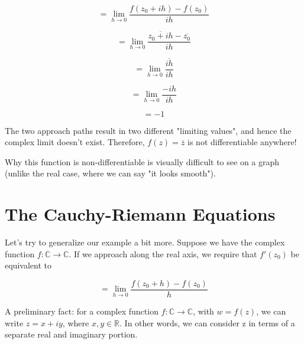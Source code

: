 \documentclass{article}
\newcommand*\conj[1]{\overline{#1}}
\begin{document}
\begin{itemize}
\begin{equation}
= \lim_{h \to 0}\frac{f(z_0 + ih)-f(z_0)}{ih}
\end{equation}

\begin{equation}
= \lim_{h \to 0}\frac{\conj{z_0 + ih}-\conj{z_0}}{ih}
\end{equation}

\begin{equation}
= \lim_{h \to 0}\frac{\conj{ih}}{ih}
\end{equation}

\begin{equation}
= \lim_{h \to 0}\frac{-ih}{ih}
\end{equation}

\begin{equation}
= -1
\end{equation}




\end{itemize}

The two approach paths result in two different "limiting values", and hence the complex limit doesn't exist. Therefore, $f(z) = \conj{z}$ is not differentiable anywhere!


Why this function is non-differentiable is visually difficult to see on a graph (unlike the real case, where we can say "it looks smooth"). 


\section{The Cauchy-Riemann Equations}

Let's try to generalize our example a bit more. Suppose we have the complex function $f: \mathbb{C} \rightarrow \mathbb{C}$. If we approach along the real axis, we require that $f'(z_0)$ be equivalent to


\begin{equation}
= \lim_{h \to 0}\frac{f(z_0 + h)-f(z_0)}{h}
\end{equation}





A preliminary fact: for a complex function $f: \mathbb{C} \rightarrow \mathbb{C}$, with $w = f(z)$, we can write $z = x + iy$, where $x, y \in \mathbb{R}$. In other words, we can consider z in terms of a separate real and imaginary portion. 
\end{document}
